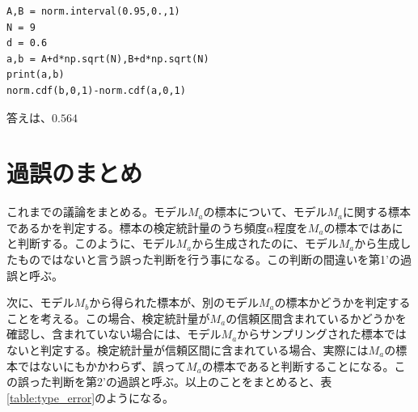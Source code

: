 \begin{lstlisting}
A,B = norm.interval(0.95,0.,1)
N = 9
d = 0.6
a,b = A+d*np.sqrt(N),B+d*np.sqrt(N)
print(a,b)
norm.cdf(b,0,1)-norm.cdf(a,0,1)
\end{lstlisting}

答えは、$0.564$

\section{過誤のまとめ}
これまでの議論をまとめる。モデル$M_a$の標本について、モデル$M_a$に関する標本であるかを判定する。標本の検定統計量のうち頻度$\alpha$程度を$M_a$の標本ではあにと判断する。このように、モデル$M_a$から生成されたのに、モデル$M_a$から生成したものではないと言う誤った判断を行う事になる。この判断の間違いを第1'の過誤と呼ぶ。

次に、モデル$M_b$から得られた標本が、別のモデル$M_a$の標本かどうかを判定することを考える。この場合、検定統計量が$M_a$の信頼区間含まれているかどうかを確認し、含まれていない場合には、モデル$M_a$からサンプリングされた標本ではないと判定する。検定統計量が信頼区間に含まれている場合、実際には$M_a$の標本ではないにもかかわらず、誤って$M_a$の標本であると判断することになる。この誤った判断を第2'の過誤と呼ぶ。以上のことをまとめると、表\ref{table:type_error}のようになる。

